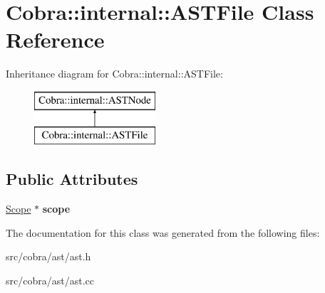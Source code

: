 \hypertarget{class_cobra_1_1internal_1_1_a_s_t_file}{\section{Cobra\+:\+:internal\+:\+:A\+S\+T\+File Class Reference}
\label{class_cobra_1_1internal_1_1_a_s_t_file}
}
Inheritance diagram for Cobra\+:\+:internal\+:\+:A\+S\+T\+File\+:\begin{figure}[H]
\begin{center}
\leavevmode
\includegraphics[height=2.000000cm]{class_cobra_1_1internal_1_1_a_s_t_file}
\end{center}
\end{figure}
\subsection*{Public Attributes}
\begin{DoxyCompactItemize}
\item 
\hypertarget{class_cobra_1_1internal_1_1_a_s_t_file_affc71f3bf233586e51d4c5b0aa938962}{\hyperlink{class_cobra_1_1internal_1_1_scope}{Scope} $\ast$ {\bfseries scope}}\label{class_cobra_1_1internal_1_1_a_s_t_file_affc71f3bf233586e51d4c5b0aa938962}

\end{DoxyCompactItemize}


The documentation for this class was generated from the following files\+:\begin{DoxyCompactItemize}
\item 
src/cobra/ast/ast.\+h\item 
src/cobra/ast/ast.\+cc\end{DoxyCompactItemize}
